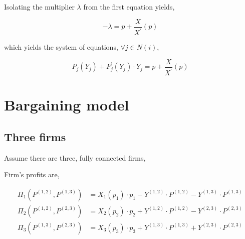\documentclass[american]{scrartcl}
\begin{document}
Isolating the multiplier $\lambda$ from the first equation yields,

\begin{equation}
    - \lambda = p + \frac{X}{X^\prime}(p)
\end{equation}

which yields the system of equations, $\forall j \in N(i)$,

\begin{equation}
    P_j(Y_j) + P^\prime_j(Y_j) \cdot Y_j = p + \frac{X}{X^\prime}(p)
\end{equation}

\newpage
\section{Bargaining model}

\subsection{Three firms}

Assume there are three, fully connected firms,

\begin{center}
\end{center}

Firm's profits are,

\begin{equation}
    \begin{split}
        \Pi_1(P^{(1, 2)}, P^{(1, 3)}) &= X_1(p_1) \cdot p_1 - Y^{(1, 2)} \cdot P^{(1, 2)} - Y^{(1, 3)} \cdot P^{(1, 3)}\\
        \Pi_2(P^{(1, 2)}, P^{(2, 3)}) &= X_2(p_2) \cdot p_2 + Y^{(1, 2)} \cdot P^{(1, 2)} - Y^{(2, 3)} \cdot P^{(2, 3)} \\
        \Pi_3(P^{(1, 3)}, P^{(2, 3)}) &= X_3(p_3) \cdot p_3 + Y^{(1, 3)} \cdot P^{(1, 3)} + Y^{(2, 3)} \cdot P^{(2, 3)}
    \end{split}
\end{equation}
\end{document}
